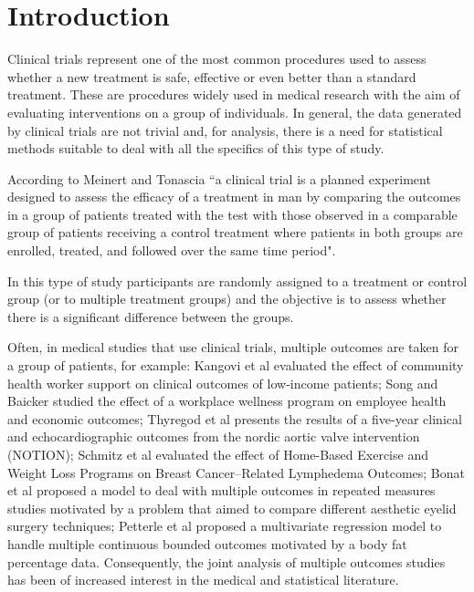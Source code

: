 \documentclass[Review,sagev,times, doublespace]{sagej}
\begin{document}

\maketitle

\section{Introduction}\label{sec1}


Clinical trials represent one of the most common procedures used to assess whether a new treatment is safe, effective or even better than a standard treatment. These are procedures widely used in medical research with the aim of evaluating interventions on a group of individuals. In general, the data generated by clinical trials are not trivial and, for analysis, there is a need for statistical methods suitable to deal with all the specifics of this type of study.

According to Meinert and Tonascia \cite{meinert1986clinical} ``a clinical trial is a planned experiment designed to assess the efficacy of a treatment in man by comparing the outcomes in a group of patients treated with the test with those observed in a comparable group of patients receiving a control treatment where patients in both groups are enrolled, treated, and followed over the same time period".

In this type of study participants are randomly assigned to a treatment or control group (or to multiple treatment groups) \cite{hannan2008randomized} and the objective is to assess whether there is a significant difference between the groups.


Often, in medical studies that use clinical trials, multiple outcomes are taken for a group of patients, for example: Kangovi et al \cite{kangovi2018effect} evaluated the effect of community health worker support on clinical outcomes of low-income patients; Song and Baicker \cite{song2019effect} studied the effect of a workplace wellness program on employee health and economic outcomes; Thyregod et al \cite{thyregod2019five} presents the results of a five-year clinical and echocardiographic outcomes from the nordic aortic valve intervention (NOTION); Schmitz et al \cite{schmitz2019effect} evaluated the effect of Home-Based Exercise and Weight Loss Programs on Breast Cancer–Related Lymphedema Outcomes; Bonat et al \cite{plastica} proposed a model to deal with multiple outcomes in repeated measures studies motivated by a problem that aimed to compare different aesthetic eyelid surgery techniques; Petterle et al \cite{petterle2021multivariate} proposed a multivariate regression model to handle multiple continuous bounded outcomes motivated by a body fat percentage data. Consequently, the joint analysis of multiple outcomes studies has been of increased interest in the medical and statistical literature. 
\end{document}
